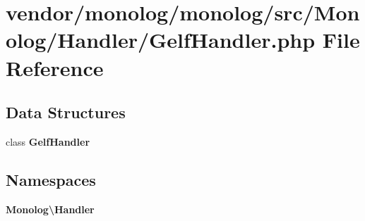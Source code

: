 \section{vendor/monolog/monolog/src/\+Monolog/\+Handler/\+Gelf\+Handler.php File Reference}
\label{_gelf_handler_8php}
\subsection*{Data Structures}
\begin{DoxyCompactItemize}
\item 
class {\bf Gelf\+Handler}
\end{DoxyCompactItemize}
\subsection*{Namespaces}
\begin{DoxyCompactItemize}
\item 
 {\bf Monolog\textbackslash{}\+Handler}
\end{DoxyCompactItemize}
